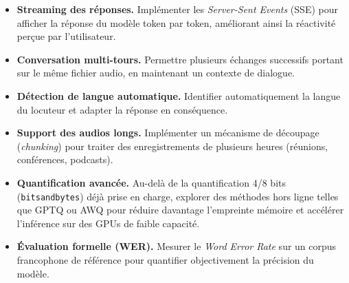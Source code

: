 \documentclass[12pt,a4paper]{report}
\begin{document}
\begin{itemize}
  \item \textbf{Streaming des réponses.} Implémenter les \textit{Server-Sent Events} (SSE)
        pour afficher la réponse du modèle token par token, améliorant ainsi la réactivité
        perçue par l'utilisateur.

  \item \textbf{Conversation multi-tours.} Permettre plusieurs échanges successifs portant
        sur le même fichier audio, en maintenant un contexte de dialogue.

  \item \textbf{Détection de langue automatique.} Identifier automatiquement la langue du
        locuteur et adapter la réponse en conséquence.

  \item \textbf{Support des audios longs.} Implémenter un mécanisme de découpage
        (\textit{chunking}) pour traiter des enregistrements de plusieurs heures (réunions,
        conférences, podcasts).

  \item \textbf{Quantification avancée.} Au-delà de la quantification 4/8 bits
        (\texttt{bitsandbytes}) déjà prise en charge, explorer des méthodes hors ligne
        telles que GPTQ ou AWQ pour réduire davantage l'empreinte mémoire et accélérer
        l'inférence sur des GPUs de faible capacité.

  \item \textbf{Évaluation formelle (WER).} Mesurer le \textit{Word Error Rate} sur un
        corpus francophone de référence pour quantifier objectivement la précision du
        modèle.
\end{itemize}

\printbibliography[heading=bibintoc, title={Références bibliographiques}]
\end{document}

